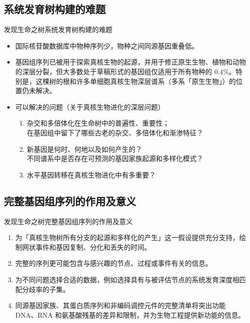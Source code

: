 \documentclass{beamer}
\begin{document}

	\subsection*{系统发育树构建的难题}
	\begin{frame}{发现生命之树}{系统发育树构建的难题}

		\begin{itemize}
			\item 国际核苷酸数据库中物种序列少，物种之间同源基因重叠低。
			\item 基因组序列已被用于探索真核生物的起源，并用于修正原生生物、植物和动物的深层分裂，但大多数处于草稿形式的基因组仅适用于所有物种的 $0.4\%$。特别是，这棵树的根和许多单细胞真核生物深层谱系（多系「原生生物」）的位置仍未解决。
			\item 可以解决的问题（关于真核生物进化的深层问题）
			\begin{enumerate}
				\item 杂交和多倍体化在生命树中的普遍性、重要性；\\在基因组中留下了哪些古老的杂交、多倍体化和渐渗特征？
				\item 新基因是何时、何地以及如何产生的？\\不同谱系中是否存在可预测的基因家族起源和多样化模式？
				\item 水平基因转移在真核生物进化中有多重要？
			\end{enumerate}
		\end{itemize}
		
	\end{frame}

	

	\subsection*{完整基因组序列的作用及意义}
	\begin{frame}{发现生命之树}{完整基因组序列的作用及意义}
		\begin{enumerate}
			\item 为「真核生物树所有分支的起源和多样化的产生」这一假设提供充分支持，绘制网状事件和基因复制、分化和丢失的时间。
			\item 完整的序列更可能包含与感兴趣的节点、过程或事件有关的信息。
			\item 为不同问题选择合适的数据，例如选择具有与被评估节点的系统发育深度相匹配分歧率的子集。
			\item 同源基因家族、其蛋白质序列和非编码调控元件的完整清单将突出功能 DNA、RNA 和氨基酸残基的差异和限制，并为生物工程提供新功能的信息。
		\end{enumerate}
	\end{frame}
\end{document}
